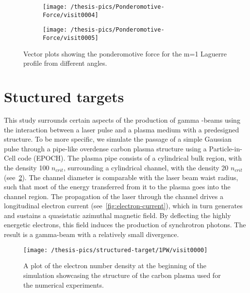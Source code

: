 \documentclass[12pt, class=report, crop=false]{standalone}
\begin{document}
\begin{figure}[!h]
  \centering
  \begin{subfigure}[t]{0.85\textwidth}
    \centering
    \texttt{[image: /thesis-pics/Ponderomotive-Force/visit0004]}
  \end{subfigure}
  \hfill
  \begin{subfigure}[t]{0.85\textwidth}
    \centering
    \texttt{[image: /thesis-pics/Ponderomotive-Force/visit0005]}
  \end{subfigure}
  \caption{Vector plots showing the ponderomotive force for the m=1 Laguerre profile from different angles.}
  \label{fig:ponderomotive-force-3}%
\end{figure}

\section{Stuctured targets}

This study surrounds certain aspects of the production of gamma
-beams using the interaction between a laser pulse and a plasma medium
with a predesigned structure. To be more specific, we simulate the
passage of a simple Gaussian pulse through a pipe-like overdense
carbon plasma structure using a Particle-in-Cell code (EPOCH). The
plasma pipe consists of a cylindrical bulk region, with the density
100 \(n_{crit}\), surrounding a cylindrical channel, with the density
20 \(n_{crit}\) (see~\cref{fig:pipe}). The channel diameter is
comparable with the laser beam waist radius, such that most of the
energy transferred from it to the plasma goes into the channel region. The
propagation of the laser through the channel drives a longitudinal
electron current (see~\cref{fig:electron-current}), which in turn
generates and sustains a quasistatic azimuthal magnetic field. By
deflecting the highly energetic electrons, this field induces the
production of synchrotron photons. The result is a gamma-beam with a
relatively small divergence.

\begin{figure}[!h]
  \centering
  \texttt{[image: /thesis-pics/structured-target/1PW/visit0000]}%
  \caption{A plot of the electron number density at the beginning of
  the simulation showcasing the structure of the carbon plasma used
  for the numerical experiments.}
  \label{fig:pipe}%
\end{figure}
\end{document}
